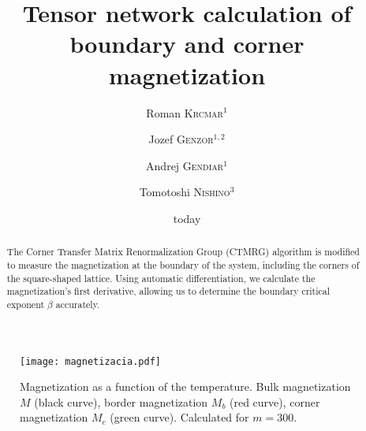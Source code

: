 \documentclass[showpacs,amssymb,twocolumn,floatfix,aps,pre,notitlepage]{revtex4-2}
\begin{document}
\title{Tensor network calculation of boundary and corner magnetization}

\author{Roman \textsc{Krcmar}$^{1}$}
\author{Jozef \textsc{Genzor}$^{1,2}$}
\author{Andrej \textsc{Gendiar}$^{1}$}
\author{Tomotoshi \textsc{Nishino}$^{3}$}


\date{today} %

\begin{abstract}
The Corner Transfer Matrix Renormalization Group (CTMRG) algorithm is modified to measure the magnetization at the boundary of the system, including the corners of the square-shaped lattice. Using automatic differentiation, we calculate the magnetization's first derivative, allowing us to determine the boundary critical exponent $\beta$ accurately.
\end{abstract}

\maketitle

\begin{figure}[htb]
\begin{center}
\texttt{[image: magnetizacia.pdf]}
\caption{Magnetization as a function of the temperature. Bulk magnetization $M$ (black curve), border magnetization $M_b$ (red curve), corner magnetization $M_c$ (green curve). Calculated for $m = 300$.}
\label{fig:mag}
\end{center}
\end{figure}
\end{document}
